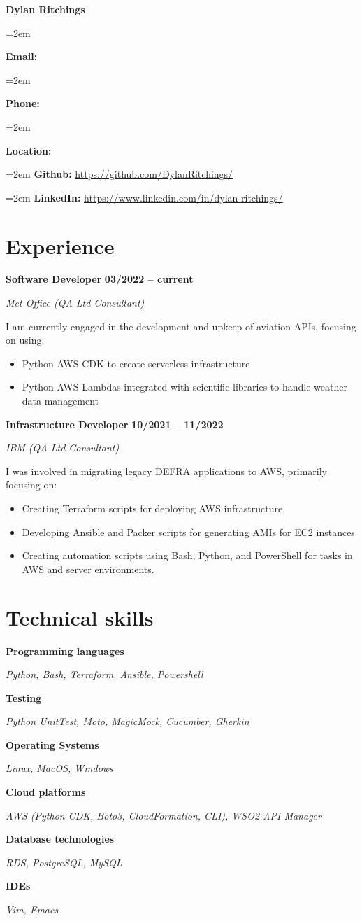 \documentclass[12pt]{article}
\newlength{\spacebox}
\newcommand{\sepspace}{\vspace*{1em}}
\newcommand{\name}[1]{
\Huge 
\begin{center} \textbf{#1} \end{center}\par
\normalsize}
\newcommand{\info}[2]{
  \noindent\hangindent=2em\hangafter=0
  \parbox{\spacebox}{%
    \textbf{#1:}} #2 \par
  } %
\newcommand{\link}[2]{
  \noindent\hangindent=2em\hangafter=0
  \textbf{#1:} \url{#2} \par
  }
\newcommand{\skill}[2]{
\noindent\hangafter=0
\begin{minipage}[t]{0.31\textwidth}
  \textbf{#1} 
  \end{minipage}
  \hfill %
  \begin{minipage}[t]{0.6\textwidth}
      #2
  \end{minipage}
  \par
  \vspace*{0.5em}} %
\newcommand{\work}[4]{
  \noindent  \textbf{#1}
  \hfill 
  {%
  \centering\textbf{#2}} \par
  \noindent \textit{#3} \par
  \vspace*{0.3em}
  \noindent\hangafter=0 \small #4 
\normalsize \par}
\begin{document}
\name{Dylan Ritchings}
\vspace*{-10pt}

\sepspace
\info{Email}{}
\info{Phone}{}
\info{Location}{}

\sepspace
\link{Github}{https://github.com/DylanRitchings/}
\link{LinkedIn}{https://www.linkedin.com/in/dylan-ritchings/}

\section*{Experience}

\work{Software Developer}{03/2022 -- current}{Met Office (QA Ltd Consultant)}
{I am currently engaged in the development and upkeep of aviation APIs, focusing on using:

\begin{itemize}
    \item Python AWS CDK to create serverless infrastructure
    \item Python AWS Lambdas integrated with scientific libraries to handle weather data management
\end{itemize}}

\sepspace

\work{Infrastructure Developer}{10/2021 -- 11/2022}{IBM (QA Ltd Consultant)}
{I was involved in migrating legacy DEFRA applications to AWS, primarily focusing on:
\begin{itemize}
    \item Creating Terraform scripts for deploying AWS infrastructure
    \item Developing Ansible and Packer scripts for generating AMIs for EC2 instances
    \item Creating automation scripts using Bash, Python, and PowerShell for tasks in AWS and server environments.
\end{itemize}}

\section*{Technical skills}

\skill{Programming languages}{\textsl{Python, Bash, Terraform, Ansible, Powershell}}
\skill{Testing}{\textsl {Python UnitTest, Moto, MagicMock, Cucumber, Gherkin}}
\skill{Operating Systems}{\textsl{Linux, MacOS, Windows}}
\skill{Cloud platforms}{\textsl{AWS (Python CDK, Boto3, CloudFormation, CLI), WSO2 API Manager}}
\skill{Database technologies}{\textsl{RDS, PostgreSQL, MySQL}}
\skill{IDEs}{\textsl{Vim, Emacs}}
\end{document}
